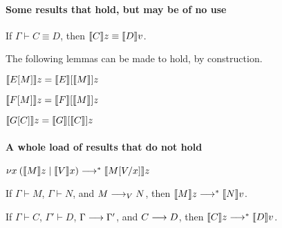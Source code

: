 \documentclass[orivec,envcountsame]{llncs}
\begin{document}
\paragraph{Some results that hold, but may be of no use}

\begin{theorem}
If $\Gamma \vdash C \equiv D$, then $\llbracket C \rrbracket z \equiv \llbracket D \rrbracket v$.
\end{theorem}
%
The following lemmas can be made to hold, by construction.
%
\begin{lemma}
$\llbracket E[M] \rrbracket z = \llbracket E \rrbracket[\llbracket M \rrbracket]z$
\end{lemma}

\begin{lemma}
$\llbracket F[M] \rrbracket z = \llbracket F \rrbracket[\llbracket M \rrbracket]z$
\end{lemma}

\begin{lemma}
$\llbracket G[C] \rrbracket z = \llbracket G \rrbracket[\llbracket C \rrbracket]z$
\end{lemma}

\paragraph{A whole load of results that do not hold}

\begin{lemma}
$\nu x \: (\llbracket M \rrbracket z \mid \llbracket V \rrbracket x) \longrightarrow^* \llbracket M[V/x] \rrbracket z$
\end{lemma}

\begin{theorem}
If $\Gamma \vdash M$, $\Gamma \vdash N$, and $M \longrightarrow_V N$, then $\llbracket M \rrbracket z
\longrightarrow^* \llbracket N \rrbracket v$.
\end{theorem}

\begin{theorem}
If $\Gamma \vdash C$, $\Gamma' \vdash D$, $\Gamma \longrightarrow \Gamma'$, and $C \longrightarrow D$, then $\llbracket C \rrbracket z
\longrightarrow^* \llbracket D \rrbracket v$.
\end{theorem}








\end{document}
